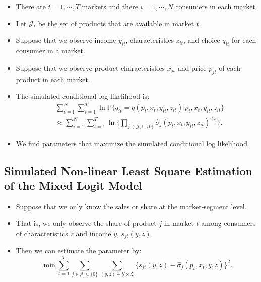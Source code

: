 \documentclass[
]{book}
\providecommand{\tightlist}{%
  \setlength{\itemsep}{0pt}\setlength{\parskip}{0pt}}
\begin{document}
\begin{itemize}
\item
  There are \(t = 1, \cdots, T\) markets and there \(i = 1, \cdots, N\) consumers in each market.
\item
  Let \(\mathcal{J}_t\) be the set of products that are available in market \(t\).
\item
  Suppose that we observe income \(y_{it}\), characteristics \(z_{it}\), and choice \(q_{it}\) for each consumer in a market.
\item
  Suppose that we observe product characteristics \(x_{jt}\) and price \(p_{jt}\) of each product in each market.
\item
  The simulated conditional log likelihood is:
  \begin{equation}
  \begin{split}
  &\sum_{i = 1}^N \sum_{t = 1}^T \ln \mathbb{P}\{q_{it} = q(p_t, x_t, y_{it}, z_{it})|p_t, x_t, y_{it}, z_{it}\} \\
  &\approx \sum_{i = 1}^N \sum_{t = 1}^T \ln \Bigg\{ \prod_{j \in \mathcal{J}_t \cup \{0\}} \hat{\sigma}_{j}(p_t, x_t, y_{it}, z_{it})^{q_{itj}} \Bigg\}.
  \end{split}
  \end{equation}
\item
  We find parameters that maximize the simulated conditional log likelihood.
\end{itemize}

\hypertarget{simulated-non-linear-least-square-estimation-of-the-mixed-logit-model}{%
\subsection{Simulated Non-linear Least Square Estimation of the Mixed Logit Model}\label{simulated-non-linear-least-square-estimation-of-the-mixed-logit-model}}

\begin{itemize}
\tightlist
\item
  Suppose that we only know the sales or share at the market-segment level.
\item
  That is, we only observe the share of product \(j\) in market \(t\) among consumers of characteristics \(z\) and income \(y\), \(s_{jt}(y, z)\).
\item
  Then we can estimate the parameter by:
  \begin{equation}
  \min \sum_{t = 1}^T \sum_{j \in \mathcal{J}_t \cup \{0\}} \sum_{(y, z) \in \mathcal{Y} \times \mathcal{Z}} \{s_{jt}(y, z) - \hat{\sigma}_{j}(p_t, x_t, y, z)\}^2.
  \end{equation}
\end{itemize}
\end{document}
